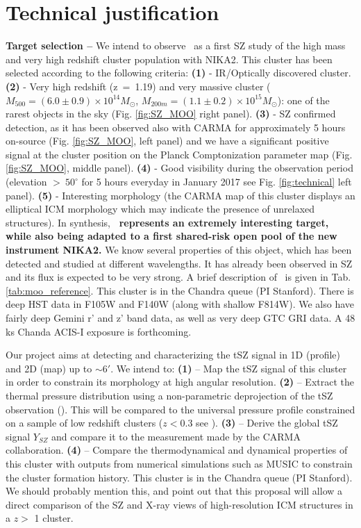 \documentclass[11pt,a4paper,twoside,graphicx,color]{article}
\begin{document}
\section{Technical justification}
{\bf \large Target selection -- }
We intend to observe \moo\ as a first SZ study of the high mass and very high redshift cluster population with NIKA2. This cluster has been selected according to the following criteria: \textbf{(1)} - IR/Optically discovered cluster. \textbf{(2)} - Very high redshift (z~=~1.19) and very massive cluster ($M_{500} = (6.0 \pm 0.9) \times 10^{14} M_{\odot}$, $M_{200m} = (1.1 \pm 0.2) \times 10^{15} M_{\odot}$): one of the rarest objects in the sky (Fig. \ref{fig:SZ_MOO} right panel). \textbf{(3)} - SZ confirmed detection, as it has been observed also with CARMA for approximately 5 hours on-source (Fig. \ref{fig:SZ_MOO}, left panel) and we have a significant positive signal at the cluster position on the Planck Comptonization parameter map (Fig. \ref{fig:SZ_MOO}, middle panel). \textbf{(4)} - Good visibility during the observation period (elevation $>~50^\circ$ for 5 hours everyday in January 2017 see Fig. \ref{fig:technical} left panel). \textbf{(5)} - Interesting morphology (the CARMA map of this cluster displays an elliptical ICM morphology which may indicate the presence of unrelaxed structures). 
In synthesis, \textbf{\moo\ represents an extremely interesting target, while also being adapted to a first shared-risk open pool of the new instrument NIKA2.} We know several properties of this object, which has been detected and studied at different wavelengths. It has already been observed in SZ and its flux is expected to be very strong. A brief description of \moo\ is given in Tab. \ref{tab:moo_reference}. {\color{red}This cluster is in the Chandra queue (PI Stanford).  There is deep HST data in F105W and F140W (along with shallow F814W).  We also have fairly deep Gemini r' and z' band data, as well as very deep GTC GRI data.  A 48 ks Chanda ACIS-I exposure is forthcoming.}

Our project aims at detecting and characterizing the tSZ signal in 1D (profile) and 2D (map) up to $\sim 6'$. We intend to: \textbf{(1)} – Map the tSZ signal of this cluster in order to constrain its morphology at high angular resolution. \textbf{(2)} – Extract the thermal pressure distribution using a non-parametric deprojection of the tSZ observation (\cite{rup16}). This will be compared to the universal pressure profile constrained on a sample of low redshift clusters ($z < 0.3$ see \cite{arn10}). \textbf{(3)} – Derive the global tSZ signal $Y_{SZ}$ and compare it to the measurement made by the CARMA collaboration. \textbf{(4)} – Compare the thermodynamical and dynamical properties of this cluster with outputs from numerical simulations such as MUSIC \cite{sem14} to constrain the cluster formation history.
{\color{red}This cluster is in the Chandra queue (PI Stanford).  We should probably mention this, and point out that this proposal will allow a direct comparison of the SZ and X-ray views of high-resolution ICM structures in a $z >$ 1 cluster.}
\end{document}
